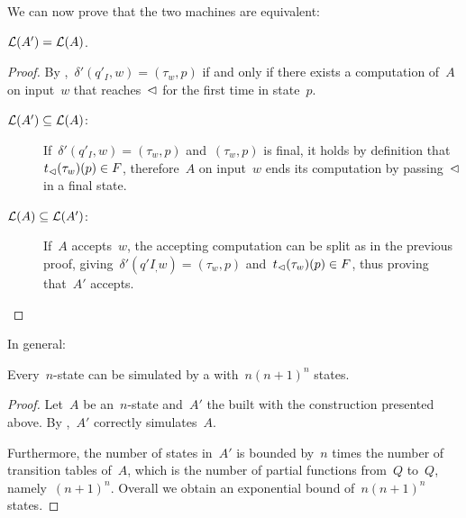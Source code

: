 We can now prove that the two machines are equivalent:
\begin{thrm}\label{thm:transtab2DFA}
	$\mathcal L(A')=\mathcal L(A)$.
\end{thrm}
\begin{proof}
	By ,~$\delta'(q'_I,w)=(\tau_w,p)$ if and only if there exists a computation of~$A$ on input~$w$ that reaches~$\lhd$ for the first time in state~$p$.
	\begin{description}
		\item[$\mathcal L(A')\subseteq\mathcal L(A)$:] If~$\delta'(q'_I,w)=(\tau_w,p)$ and~$(\tau_w,p)$ is final, it holds by definition that~$t_\lhd(\tau_w)(p)\in F$, therefore~$A$ on input~$w$ ends its computation by passing~$\lhd$ in a final state.
		\item[$\mathcal L(A)\subseteq\mathcal L(A')$:] If~$A$ accepts~$w$, the accepting computation can be split as in the previous proof, giving~$\delta'(q'I_,w)=(\tau_w,p)$ and~$t_\lhd(\tau_w)(p)\in F$, thus proving that~$A'$ accepts. \qedhere
	\end{description}
\end{proof}

In general:
\begin{thrm}
	Every~$n$-state \TDFA can be simulated by a \ODFA with~$n(n+1)^n$ states.
\end{thrm}
\begin{proof}
	Let~$A$ be an~$n$-state \TDFA and~$A'$ the \ODFA built with the construction presented above.
	By ,~$A'$ correctly simulates~$A$.

	Furthermore, the number of states in~$A'$ is bounded by~$n$ times the number of transition tables of~$A$, which is the number of partial functions from~$Q$ to~$Q$, namely~$(n+1)^n$.
	Overall we obtain an exponential bound of~$n(n+1)^n$ states.
\end{proof}

